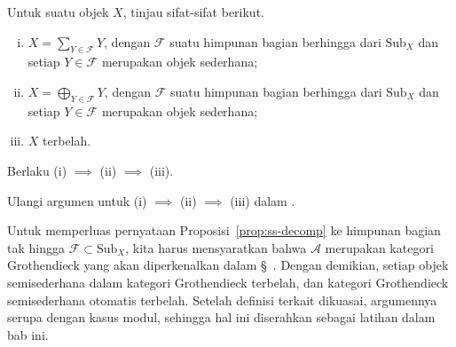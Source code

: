 \begin{proposisi}\label{prop:ss-decomp}
    Untuk suatu objek $X$, tinjau sifat-sifat berikut.
    \begin{enumerate}[(i)]
        \item $X=\sum_{Y\in\mathcal{F}}Y$, dengan $\mathcal{F}$ suatu himpunan
        bagian berhingga dari $\mathrm{Sub}_X$ dan setiap $Y\in\mathcal{F}$
        merupakan objek sederhana;
        \item $X=\bigoplus_{Y\in\mathcal{F}}Y$, dengan $\mathcal{F}$ suatu
        himpunan bagian berhingga dari $\mathrm{Sub}_X$ dan setiap
        $Y\in\mathcal{F}$ merupakan objek sederhana;
        \item $X$ terbelah.
    \end{enumerate}
    Berlaku (i) $\implies$ (ii) $\implies$ (iii).
\end{proposisi}
\begin{bukti}
    Ulangi argumen untuk (i) $\implies$ (ii) $\implies$ (iii) dalam
\cite[Proposisi 6.11.4]{Li1}.
\end{bukti}

\begin{catatan}\label{rem:Grothendieck-ss-decomp}
    Untuk memperluas pernyataan Proposisi~\ref{prop:ss-decomp} ke himpunan bagian
tak hingga $\mathcal{F}\subset\mathrm{Sub}_X$, kita harus mensyaratkan bahwa
$\mathcal{A}$ merupakan kategori Grothendieck yang akan diperkenalkan dalam
\S~. Dengan demikian, setiap objek semisederhana
dalam kategori Grothendieck terbelah, dan kategori Grothendieck semisederhana
otomatis terbelah. Setelah definisi terkait dikuasai, argumennya serupa dengan
kasus modul, sehingga hal ini diserahkan sebagai latihan dalam
bab ini.
\end{catatan}
